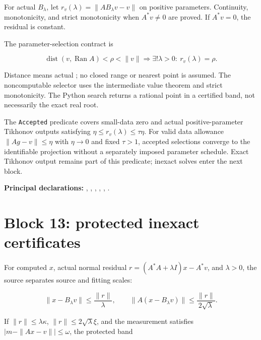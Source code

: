\documentclass[11pt]{article}
\begin{document}
For actual \(B_\lambda\), let \(r_v(\lambda)=\|AB_\lambda v-v\|\) on
positive parameters. Continuity, monotonicity, and strict monotonicity
when \(A^*v\ne0\) are proved. If \(A^*v=0\), the residual is constant.

The parameter-selection contract is

\[
\operatorname{dist}(v,\operatorname{Ran}A)<\rho<\|v\|
\Longrightarrow\exists!\lambda>0:\ r_v(\lambda)=\rho.
\]

Distance means actual \texttt{}; no
closed range or nearest point is assumed. The noncomputable selector
uses the intermediate value theorem and strict monotonicity. The Python
search returns a rational point in a certified band, not necessarily the
exact real root.

The \texttt{Accepted} predicate covers small-data zero
and actual positive-parameter Tikhonov outputs satisfying
\(\eta\le r_v(\lambda)\le\tau\eta\). For valid data allowance
\(\|Ag-v\|\le\eta\) with \(\eta\to0\) and fixed \(\tau>1\), accepted
selections converge to the identifiable projection without a separately
imposed parameter schedule. Exact Tikhonov output remains part of this
predicate; inexact solves enter the next block.

\textbf{Principal declarations:}
\texttt{},
\texttt{},
\texttt{},
\texttt{},
\texttt{},
\texttt{}.

\hypertarget{block-13-protected-inexact-certificates}{%
\section{Block 13: protected inexact
certificates}\label{block-13-protected-inexact-certificates}}

For computed \(x\), actual normal residual \(r=(A^*A+\lambda I)x-A^*v\),
and \(\lambda>0\), the source separates source and fitting scales:

\[
\|x-B_\lambda v\|\le\frac{\|r\|}{\lambda},\qquad
\|A(x-B_\lambda v)\|\le\frac{\|r\|}{2\sqrt\lambda}.
\]

If \(\|r\|\le\lambda\kappa\), \(\|r\|\le2\sqrt\lambda\xi\), and the
measurement satisfies \(|m-\|Ax-v\||\le\omega\), the protected band
\end{document}
